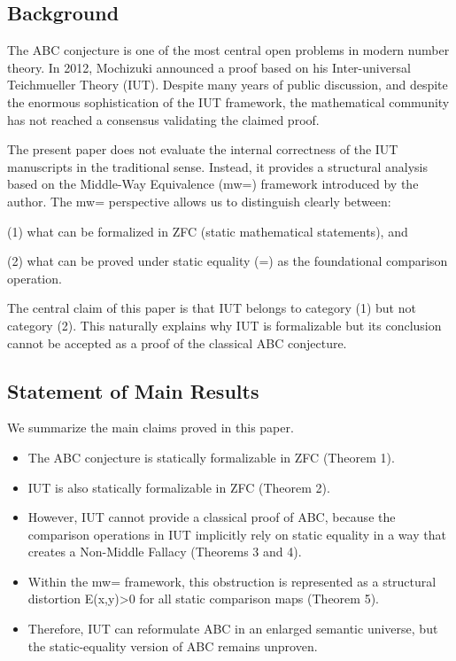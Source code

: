 \documentclass[11pt]{article}
\begin{document}
\subsection{Background}

The ABC conjecture is one of the most central open problems in modern
number theory. In 2012, Mochizuki announced a proof based on his
Inter-universal Teichmueller Theory (IUT). Despite many years of public
discussion, and despite the enormous sophistication of the IUT framework,
the mathematical community has not reached a consensus validating the
claimed proof.

The present paper does not evaluate the internal correctness of the IUT
manuscripts in the traditional sense. Instead, it provides a structural
analysis based on the Middle-Way Equivalence (mw=) framework introduced
by the author. The mw= perspective allows us to distinguish clearly between:

(1) what can be formalized in ZFC (static mathematical statements), and

(2) what can be proved under static equality (=) as the foundational 
comparison operation.

The central claim of this paper is that IUT belongs to category (1) but
not category (2). This naturally explains why IUT is formalizable but its
conclusion cannot be accepted as a proof of the classical ABC conjecture.

\subsection{Statement of Main Results}

We summarize the main claims proved in this paper.

\begin{itemize}
\item[I.] The ABC conjecture is statically formalizable in ZFC (Theorem 1).
\item[II.] IUT is also statically formalizable in ZFC (Theorem 2).
\item[III.] However, IUT cannot provide a classical proof of ABC, because
the comparison operations in IUT implicitly rely on static equality in a
way that creates a Non-Middle Fallacy (Theorems 3 and 4).
\item[IV.] Within the mw= framework, this obstruction is represented as a
structural distortion E(x,y)>0 for all static comparison maps (Theorem 5).
\item[V.] Therefore, IUT can reformulate ABC in an enlarged semantic
universe, but the static-equality version of ABC remains unproven.
\end{itemize}
\end{document}
